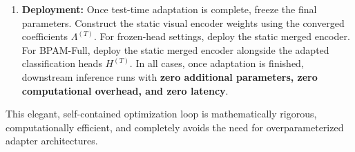 \begin{enumerate}
    In contrast, our ray-scaling projection preserves the exact directional ratios of the updated coefficients ($\lambda_k / \lambda_i = \lambda_k^{(t+1)} / \lambda_i^{(t+1)}$), thereby maintaining the collaborative representational contributions of all experts while scaling down the joint parameter energy to prevent activation collapse. Ray-scaling is thus selected for its extreme computational simplicity, convergence stability in this low-parameter regime, and its alignment with multi-task representation preservation.
    \item {\bf Deployment:} Once test-time adaptation is complete, freeze the final parameters. Construct the static visual encoder weights using the converged coefficients $\Lambda^{(T)}$. For frozen-head settings, deploy the static merged encoder. For BPAM-Full, deploy the static merged encoder alongside the adapted classification heads $H^{(T)}$. In all cases, once adaptation is finished, downstream inference runs with {\bf zero additional parameters, zero computational overhead, and zero latency}.
\end{enumerate}
This elegant, self-contained optimization loop is mathematically rigorous, computationally efficient, and completely avoids the need for overparameterized adapter architectures.
